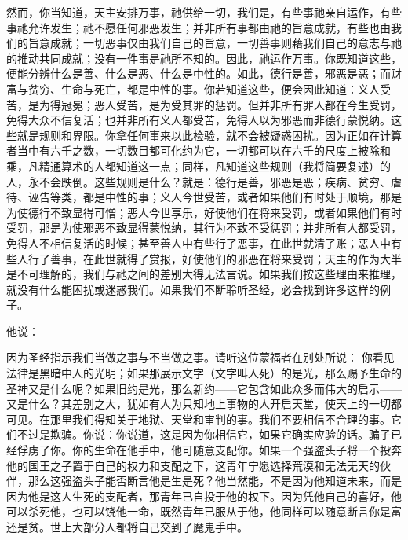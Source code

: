 然而，你当知道，天主安排万事，祂供给一切，我们是，有些事祂亲自运作，有些事祂允许发生；祂不愿任何邪恶发生；并非所有事都由祂的旨意成就，有些也由我们的旨意成就；一切恶事仅由我们自己的旨意，一切善事则藉我们自己的意志与祂的推动共同成就；没有一件事是祂所不知的。因此，祂运作万事。你既知道这些，便能分辨什么是善、什么是恶、什么是中性的。如此，德行是善，邪恶是恶；而财富与贫穷、生命与死亡，都是中性的事。你若知道这些，便会因此知道：义人受苦，是为得冠冕；恶人受苦，是为受其罪的惩罚。但并非所有罪人都在今生受罚，免得大众不信复活；也并非所有义人都受苦，免得人以为邪恶而非德行蒙悦纳。这些就是规则和界限。你拿任何事来以此检验，就不会被疑惑困扰。因为正如在计算者当中有六千之数，一切数目都可化约为它，一切都可以在六千的尺度上被除和乘，凡精通算术的人都知道这一点；同样，凡知道这些规则（我将简要复述）的人，永不会跌倒。这些规则是什么？就是：德行是善，邪恶是恶；疾病、贫穷、虐待、诬告等类，都是中性的事；义人今世受苦，或者如果他们有时处于顺境，那是为使德行不致显得可憎；恶人今世享乐，好使他们在将来受罚，或者如果他们有时受罚，那是为使邪恶不致显得蒙悦纳，其行为不致不受惩罚；并非所有人都受罚，免得人不相信复活的时候；甚至善人中有些行了恶事，在此世就清了账；恶人中有些人行了善事，在此世就得了赏报，好使他们的邪恶在将来受罚；天主的作为大半是不可理解的，我们与祂之间的差别大得无法言说。如果我们按这些理由来推理，就没有什么能困扰或迷惑我们。如果我们不断聆听圣经，必会找到许多这样的例子。\par

他说：\par

因为圣经指示我们当做之事与不当做之事。请听这位蒙福者在别处所说： 你看见法律是黑暗中人的光明；如果那展示文字（文字叫人死）的是光，那么赐予生命的圣神又是什么呢？如果旧约是光，那么新约——它包含如此众多而伟大的启示——又是什么？其差别之大，犹如有人为只知地上事物的人开启天堂，使天上的一切都可见。在那里我们得知关于地狱、天堂和审判的事。我们不要相信不合理的事。它们不过是欺骗。你说：你说道，这是因为你相信它，如果它确实应验的话。骗子已经俘虏了你。你的生命在他手中，他可随意支配你。如果一个强盗头子将一个投奔他的国王之子置于自己的权力和支配之下，这青年宁愿选择荒漠和无法无天的伙伴，那么这强盗头子能否断言他是生是死？他当然能，不是因为他知道未来，而是因为他是这人生死的支配者，那青年已自投于他的权下。因为凭他自己的喜好，他可以杀死他，也可以饶他一命，既然青年已服从于他，他同样可以随意断言你是富还是贫。世上大部分人都将自己交到了魔鬼手中。\par


